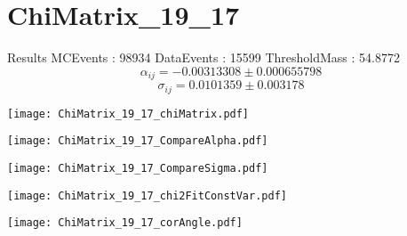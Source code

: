 \documentclass[a4paper,12pt]{article}
\begin{document}
\section{ChiMatrix\_19\_17}
\begin{minipage}{0.49\linewidth} Results \newline
MCEvents : 98934\newline
DataEvents : 15599 \newline
ThresholdMass : 54.8772\\
$$\alpha_{ij} = -0.00313308\pm 0.000655798$$
$$\sigma_{ij} = 0.0101359\pm 0.003178$$
\end{minipage}\hfill
\begin{minipage}{0.49\linewidth} 
\texttt{[image: ChiMatrix\_19\_17\_chiMatrix.pdf]}\\
\end{minipage}
\hfill
\begin{minipage}{0.49\linewidth} 
\texttt{[image: ChiMatrix\_19\_17\_CompareAlpha.pdf]}\\
\end{minipage}
\hfill
\begin{minipage}{0.49\linewidth} 
\texttt{[image: ChiMatrix\_19\_17\_CompareSigma.pdf]}\\
\end{minipage}
\begin{minipage}{0.49\linewidth} 
\texttt{[image: ChiMatrix\_19\_17\_chi2FitConstVar.pdf]}\\
\end{minipage}
\hfill
\begin{minipage}{0.49\linewidth} 
\texttt{[image: ChiMatrix\_19\_17\_corAngle.pdf]}\\
\end{minipage}
\end{document}

